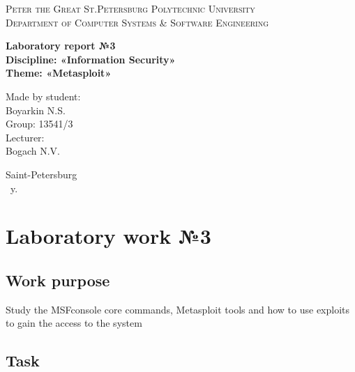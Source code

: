 \documentclass[14pt,a4paper,report]{report}
\begin{document}
\def\contentsname{Contents}

\begin{titlepage}
	\begin{center}
		\textsc{Peter the Great St.Petersburg Polytechnic University\\[5mm]
			Department of Computer Systems \& Software Engineering}
		
		\vfill
		
		\textbf{Laboratory report №3\\[3mm]
			Discipline: «Information Security»\\[3mm]
			Theme: «Metasploit»\\[41mm]
		}
	\end{center}
	
	\hfill
	\begin{minipage}{.4\textwidth}
		Made by student:\\[2mm] 
		Boyarkin N.S.\\
		Group: 13541/3\\[5mm]
		
		Lecturer:\\[2mm] 
		Bogach N.V.
	\end{minipage}
	\vfill
	\begin{center}
		Saint-Petersburg\\ \the\year\ y.
	\end{center}
\end{titlepage}

\tableofcontents
\clearpage

\chapter{Laboratory work №3}

\section{Work purpose}

Study the MSFconsole core commands, Metasploit tools and how to use exploits to gain the access to the system

\section{Task}
\end{document}
